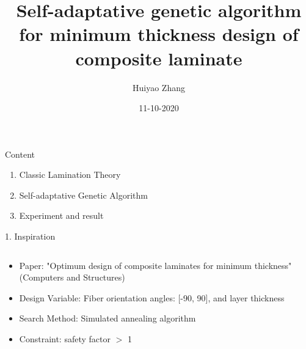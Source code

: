\documentclass{beamer}
\title{Self-adaptative genetic algorithm for minimum thickness design of composite laminate}
\author{Huiyao Zhang}
\institute{Kyoto Institue of Technology}
\date{11-10-2020}
\begin{document}
\begin{frame}
    \titlepage
\end{frame}


\begin{frame}[c]{Content} 
    \begin{enumerate}
        \item Classic Lamination Theory
        \item Self-adaptative Genetic Algorithm
        \item Experiment and result
    \end{enumerate}
\end{frame}

\begin{frame}{1. Inspiration}
\begin{columns}[c]
    \begin{column}{0.9\textwidth}
        \begin{itemize}
			\item Paper: "Optimum design of composite laminates for minimum thickness"(Computers and
				Structures)
			\item Design Variable: Fiber orientation angles: [-90, 90], and layer thickness
			\item Search Method: Simulated annealing algorithm
			\item Constraint: safety factor $>$ 1
        \end{itemize}
    \end{column}
\end{columns}

\end{frame}
\end{document}

